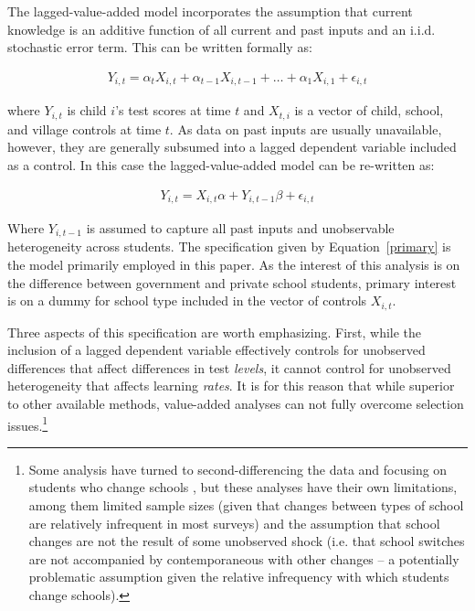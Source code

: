\documentclass[Eubank_pk_ethnic_sorting.tex]{subfiles}
\begin{document}
The lagged-value-added model incorporates the assumption that current knowledge is an additive function of all current and past inputs and an i.i.d. stochastic error term. This can be written formally as:

\begin{eqnarray}
	Y_{i,t}=\alpha_tX_{i,t}+\alpha_{t-1}X_{i,t-1}+ \dots + \alpha_1X_{i,1} + \epsilon_{i,t}
\end{eqnarray}

where $Y_{i,t}$ is child $i$'s test scores at time $t$ and $X_{t,i}$ is a vector of child, school, and village controls at time $t$. As data on past inputs are usually unavailable, however, they are generally subsumed into a lagged dependent variable included as a control. In this case the lagged-value-added model can be re-written as:

\begin{eqnarray}
	Y_{i,t}=X_{i,t}\alpha+Y_{i,t-1}\beta + \epsilon_{i,t}\label{primary}
\end{eqnarray}

Where $Y_{i,t-1}$ is assumed to capture all past inputs and unobservable heterogeneity across students. The specification given by Equation~\ref{primary} is the model primarily employed in this paper. As the interest of this analysis is on the difference between government and private school students, primary interest is on a dummy for school type included in the vector of controls $X_{i,t}$. 

Three aspects of this specification are worth emphasizing. First, while the inclusion of a lagged dependent variable effectively controls for unobserved differences that affect differences in test \emph{levels}, it cannot control for unobserved heterogeneity that affects learning \emph{rates}. It is for this reason that while superior to other available methods, value-added analyses can not fully overcome selection issues.\footnote{Some analysis have turned to second-differencing the data and focusing on students who change schools \citep{Andrabi:2011hl}, but these analyses have their own limitations, among them limited sample sizes (given that changes between types of school are relatively infrequent in most surveys) and the assumption that school changes are not the result of some unobserved shock (i.e. that school switches are not accompanied by contemporaneous with other changes -- a potentially problematic assumption given the relative infrequency with which students change schools).}
\end{document}
